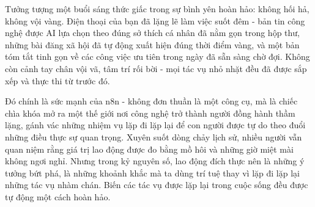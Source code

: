 \documentclass[a4paper,12pt]{book}
\begin{document}
\begin{center}
\end{center}


Tưởng tượng một buổi sáng thức giấc trong sự bình yên hoàn hảo: không hối hả, không vội vàng. Điện thoại của bạn đã lặng lẽ làm việc suốt đêm - bản tin công nghệ được AI lựa chọn theo đúng sở thích cá nhân đã nằm gọn trong hộp thư, những bài đăng xã hội đã tự động xuất hiện đúng thời điểm vàng, và một bản tóm tắt tinh gọn về các công việc ưu tiên trong ngày đã sẵn sàng chờ đợi. Không còn cảnh tay chân vội vã, tâm trí rối bời - mọi tác vụ nhỏ nhặt đều đã được sắp xếp và thực thi từ trước đó.

Đó chính là sức mạnh của n8n - không đơn thuần là một công cụ, mà là chiếc chìa khóa mở ra một thế giới nơi công nghệ trở thành người đồng hành thầm lặng, gánh vác những nhiệm vụ lặp đi lặp lại để con người được tự do theo đuổi những điều thực sự quan trọng. Xuyên suốt dòng chảy lịch sử, nhiều người vẫn quan niệm rằng giá trị lao động được đo bằng mồ hôi và những giờ miệt mài không ngơi nghỉ. 
Nhưng trong kỷ nguyên số, lao động đích thực nên là những ý tưởng bứt phá, là những khoảnh khắc mà ta dùng trí tuệ thay vì lặp đi lặp lại những tác vụ nhàm chán. Biến các tác vụ được lặp lại trong cuộc sống đều được tự động một cách hoàn hảo.
\end{document}
